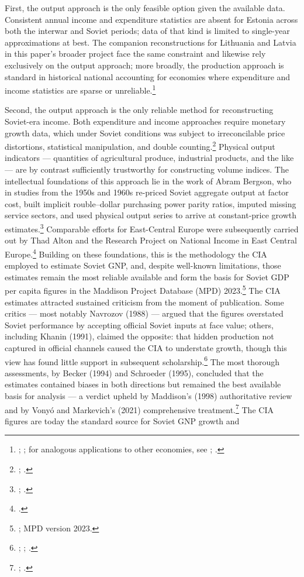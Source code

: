 \documentclass[12pt,a4paper]{article}
\begin{document}
First, the output approach is the only feasible option given the available data. Consistent annual income and expenditure statistics are absent for Estonia across both the interwar and Soviet periods; data of that kind is limited to single-year approximations at best. The companion reconstructions for Lithuania and Latvia in this paper's broader project face the same constraint and likewise rely exclusively on the output approach; more broadly, the production approach is standard in historical national accounting for economies where expenditure and income statistics are sparse or unreliable.\footnote{\autocite{klimantas2019}; \autocite{norkuslatvia1935}; for analogous applications to other economies, see \autocite[5]{kenny_irelandgdp}; \autocite[22]{broadberryinmorys}.}

Second, the output approach is the only reliable method for reconstructing Soviet-era income. Both expenditure and income approaches require monetary growth data, which under Soviet conditions was subject to irreconcilable price distortions, statistical manipulation, and double counting.\footnote{\autocite[307--308]{Maddison1998b}; \autocite[279--280]{vonyoinmorys2021}.} Physical output indicators — quantities of agricultural produce, industrial products, and the like — are by contrast sufficiently trustworthy for constructing volume indices. The intellectual foundations of this approach lie in the work of Abram Bergson, who in studies from the 1950s and 1960s re-priced Soviet aggregate output at factor cost, built implicit rouble--dollar purchasing power parity ratios, imputed missing service sectors, and used physical output series to arrive at constant-price growth estimates.\footnote{\autocite{bergson1950}; \autocite{bergson1961}.} Comparable efforts for East-Central Europe were subsequently carried out by Thad Alton and the Research Project on National Income in East Central Europe.\footnote{\autocite[328]{Maddison1995a}.} Building on these foundations, this is the methodology the CIA employed to estimate Soviet GNP, and, despite well-known limitations, those estimates remain the most reliable available and form the basis for Soviet GDP per capita figures in the Maddison Project Database (MPD) 2023.\footnote{\autocite[279--280]{vonyoinmorys2021}; MPD version 2023.} The CIA estimates attracted sustained criticism from the moment of publication. Some critics — most notably Navrozov (1988) — argued that the figures overstated Soviet performance by accepting official Soviet inputs at face value; others, including Khanin (1991), claimed the opposite: that hidden production not captured in official channels caused the CIA to understate growth, though this view has found little support in subsequent scholarship.\footnote{\autocite{assessingCIA1988}; \autocite{becker1994}; \autocite{schroeder1995}.} The most thorough assessments, by Becker (1994) and Schroeder (1995), concluded that the estimates contained biases in both directions but remained the best available basis for analysis — a verdict upheld by Maddison's (1998) authoritative review and by Vonyó and Markevich's (2021) comprehensive treatment.\footnote{\autocite{Maddison1998b}; \autocite[279--280]{vonyoinmorys2021}.} The CIA figures are today the standard source for Soviet GNP growth and 
\end{document}
